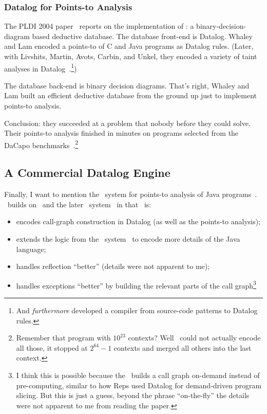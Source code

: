 \documentclass{article}
\begin{document}
\subsubsection*{Datalog for Points-to Analysis}

The PLDI 2004 paper~\cite{wl-pldi-2004} reports on the implementation of \bddbddb{}: a binary-decision-diagram based deductive database.
The database front-end is Datalog.
Whaley and Lam encoded a points-to of C and Java programs as Datalog rules.
(Later, with Livshits, Martin, Avots, Carbin, and Unkel, they encoded a variety of taint analyses in Datalog~\cite{lwlmacu-pods-2005}.\footnote{And \emph{furthermore} developed a compiler from source-code patterns to Datalog rules.})

The database back-end is binary decision diagrams.
That's right, Whaley and Lam built an efficient deductive database from the ground up just to implement points-to analysis.

Conclusion: they succeeded at a problem that nobody before they could solve.
Their points-to analysis finished in minutes on programs selected from the DaCapo benchmarks~\cite{bghkmbdffghhjlmpsvvw-oopsla-2006}.\footnote{Remember that program with $10^{23}$ contexts? Well \bddbddb\ could not actually encode all those, it stopped at $2^{64} - 1$ contexts and merged all others into the last context.}


\subsection*{A Commercial Datalog Engine}

Finally, I want to mention the \doop\ system for points-to analysis of Java programs~\cite{bs-oopsla-2009}.
\doop\ builds on \bddbddb\ and the later \paddle\ system~\cite{lh-tosem-2008} in that \doop\ is:
\begin{itemize}
\item encodes call-graph construction in Datalog (as well as the points-to analysis);
\item extends the logic from the \paddle\ system~\cite{lh-tosem-2008} to encode more details of the Java language;
\item handles reflection ``better'' (details were not apparent to me);
\item handles exceptions ``better'' by building the relevant parts of the call graph\footnote{I think this is possible because the \doop\ builds a call graph on-demand instead of pre-computing, similar to how Reps used Datalog for demand-driven program slicing. But this is just a guess, beyond the phrase ``on-the-fly'' the details were not apparent to me from reading the paper.}
\end{itemize}
\end{document}
